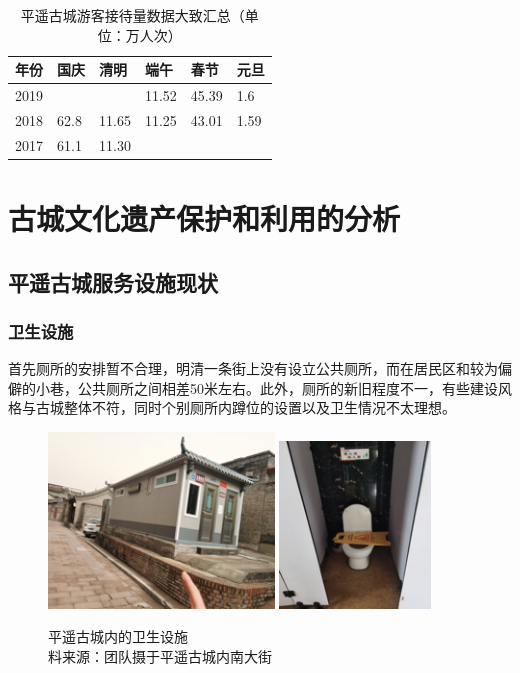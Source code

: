 \documentclass[UTF8]{ctexart}
\begin{document}
    \begin{table}[H]
        \centering
        \caption{平遥古城游客接待量数据大致汇总（单位：万人次）}
        \begin{tabular}{p{2cm}p{2cm}p{2cm}p{2cm}p{2cm}p{2cm}}
            \toprule
            年份 & 国庆&清明&端午&春节&元旦\\ 
            \midrule
            2019& & & 11.52 & 45.39 & 1.6\\ 
            2018& 62.8 & 11.65 & 11.25 & 43.01 & 1.59 \\ 
            2017& 61.1 & 11.30 & & & \\ 
            \bottomrule
        \end{tabular}
    \end{table} 
\section{古城文化遗产保护和利用的分析}
    \subsection{平遥古城服务设施现状}
        \subsubsection{卫生设施}
        首先厕所的安排暂不合理，明清一条街上没有设立公共厕所，而在居民区和较为偏僻的小巷，公共厕所之间相差50米左右。此外，厕所的新旧程度不一，有些建设风格与古城整体不符，同时个别厕所内蹲位的设置以及卫生情况不太理想。
        \begin{figure}[H]
            \centering
            \includegraphics[width=6cm]{图片 1.png}
            \includegraphics[width=4cm]{图片 3.png}
            \caption{平遥古城内的卫生设施\\料来源：团队摄于平遥古城内南大街}
    
        \end{figure}
\end{document}
